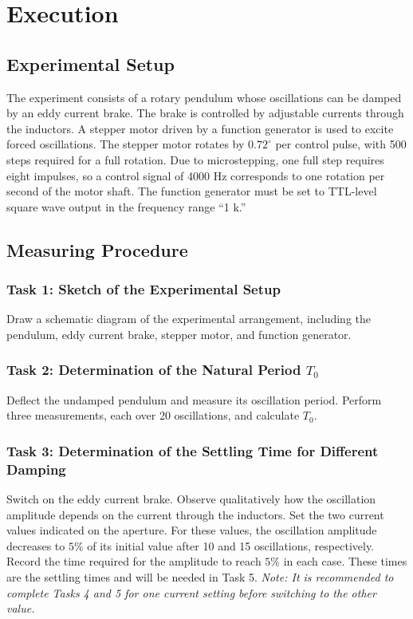 \chapter{Execution}

\section{Experimental Setup}
The experiment consists of a rotary pendulum whose oscillations can be damped by an eddy current brake. The brake is controlled by adjustable currents through the inductors. A stepper motor driven by a function generator is used to excite forced oscillations. The stepper motor rotates by $0.72^\circ$ per control pulse, with 500 steps required for a full rotation. Due to microstepping, one full step requires eight impulses, so a control signal of 4000 Hz corresponds to one rotation per second of the motor shaft. The function generator must be set to TTL-level square wave output in the frequency range “1 k.”

\section{Measuring Procedure}

\subsection*{Task 1: Sketch of the Experimental Setup}
Draw a schematic diagram of the experimental arrangement, including the pendulum, eddy current brake, stepper motor, and function generator.

\subsection*{Task 2: Determination of the Natural Period $T_0$}
Deflect the undamped pendulum and measure its oscillation period. Perform three measurements, each over 20 oscillations, and calculate $T_0$.

\subsection*{Task 3: Determination of the Settling Time for Different Damping}
Switch on the eddy current brake. Observe qualitatively how the oscillation amplitude depends on the current through the inductors. Set the two current values indicated on the aperture. For these values, the oscillation amplitude decreases to $5\%$ of its initial value after 10 and 15 oscillations, respectively. Record the time required for the amplitude to reach $5\%$ in each case. These times are the settling times and will be needed in Task 5.  
\textit{Note: It is recommended to complete Tasks 4 and 5 for one current setting before switching to the other value.}

